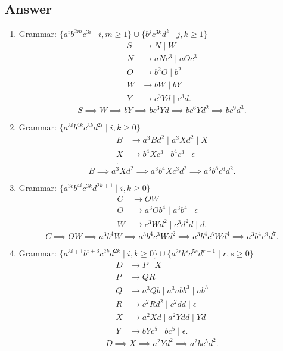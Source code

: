 \documentclass[12pt]{book}
\begin{document}
\subsection*{Answer}
\begin{enumerate}[label=\alph*)]
        \item Grammar: $\{a^ib^{2m} c^{3i} \mid i,m\geq 1\}\cup\{b^jc^{3k}d^k \mid j,k\geq 1\}$
                \begin{align*}
                        S &\to N \mid W\\
                        N &\to aNc^3  \mid aOc^3\\
                        O &\to b^2O  \mid b^2\\
                        W &\to bW \mid bY\\
                        Y &\to c^3Yd  \mid c^3d
                .\end{align*}
                \[
                S\implies W \implies bY \implies bc^3Yd \implies bc^6Yd^2 \implies bc^9d^3
                .\]

        \item Grammar: $\{a^{3i} b^{4k} c^{3k}d^{2i}  \mid i,k\geq 0\}$
                \begin{align*}
                        B &\to a^3Bd^2 \mid a^3Xd^2 \mid X\\
                        X &\to b^4Xc^3  \mid b^4c^3  \mid \epsilon\\
                .\end{align*}
                \[
                B \implies a^3Xd^2 \implies a^3b^4Xc^3d^2 \implies a^3b^8c^6d^2
                .\] 

        \item Grammar: $\{a^{3i}b^{4i}c^{3k} d^{2k+1} \mid i,k\geq 0\}$
                \begin{align*}
                        C &\to OW\\
                        O &\to a^3Ob^4  \mid a^3b^4 \mid \epsilon\\
                        W &\to c^3Wd^2 \mid c^3d^2d \mid d
                .\end{align*}
                \[
                C \implies OW \implies a^3b^4W \implies a^3b^4c^3Wd^2 \implies a^3b^4c^6Wd^4 \implies a^3b^4c^9d^7
                .\] 

        \item Grammar: $\{a^{3i+1}b^{i+3}c^{2k} d^{2k} \mid i,k\geq 0\}\cup \{a^{2r}b^sc^{5s}d^{r+1} \mid r,s\geq 0\}$
                \begin{align*}
                        D &\to P \mid X\\
                        P &\to QR\\
                        Q &\to a^3Qb \mid a^3abb^3 \mid ab^3\\
                        R &\to c^2Rd^2 \mid c^2dd \mid \epsilon\\
                        X &\to a^2Xd \mid a^2Ydd \mid Yd\\
                        Y &\to bYc^5 \mid bc^5 \mid \epsilon
                .\end{align*}
                \[
                D \implies X \implies a^2Yd^2 \implies a^2bc^5d^2 
                .\] 
\end{enumerate}
\end{document}
